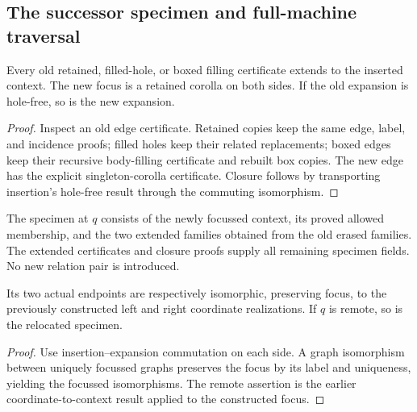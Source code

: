 \subsection{The successor specimen and full-machine traversal}
\begin{lemma}
Every old retained, filled-hole, or boxed filling certificate extends to the
inserted context. The new focus is a retained corolla on both sides. If the
old expansion is hole-free, so is the new expansion.
\end{lemma}
\begin{proof}
Inspect an old edge certificate. Retained copies keep the same edge, label,
and incidence proofs; filled holes keep their related replacements; boxed
edges keep their recursive body-filling certificate and rebuilt box copies.
The new edge has the explicit singleton-corolla certificate. Closure follows
by transporting insertion's hole-free result through the commuting isomorphism.
\end{proof}




\begin{definition}
The specimen at $q$ consists of the newly focussed context, its proved allowed
membership, and the two extended families obtained from the old erased
families. The extended certificates and closure proofs supply all remaining
specimen fields. No new relation pair is introduced.
\end{definition}
\begin{lemma}
Its two actual endpoints are respectively isomorphic, preserving focus, to the
previously constructed left and right coordinate realizations. If $q$ is
remote, so is the relocated specimen.
\end{lemma}
\begin{proof}
Use insertion--expansion commutation on each side. A graph isomorphism between
uniquely focussed graphs preserves the focus by its label and uniqueness,
yielding the focussed isomorphisms. The remote assertion is the earlier
coordinate-to-context result applied to the constructed focus.
\end{proof}

